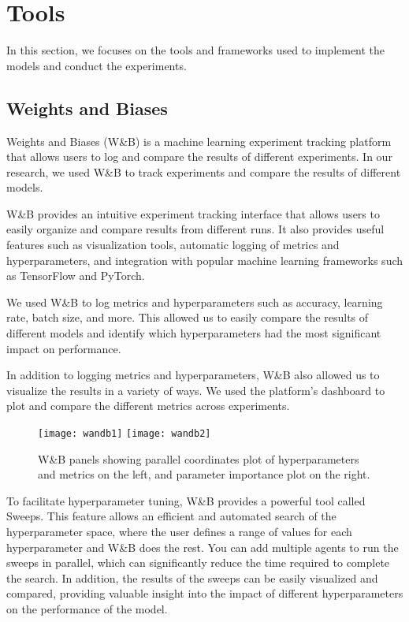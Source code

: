 \chapter{Tools}

In this section, we focuses on the tools and frameworks used to implement the models and conduct the experiments.

\section{Weights and Biases}

Weights and Biases (W\&B) \cite{wandb} is a machine learning experiment tracking platform that allows users to log and compare the results of different experiments. 
In our research, we used W\&B to track experiments and compare the results of different models.

W\&B provides an intuitive experiment tracking interface that allows users to easily organize and compare results from different runs.
It also provides useful features such as visualization tools, automatic logging of metrics and hyperparameters, and integration with popular machine learning frameworks such as TensorFlow and PyTorch.

We used W\&B to log metrics and hyperparameters such as accuracy, learning rate, batch size, and more. 
This allowed us to easily compare the results of different models and identify which hyperparameters had the most significant impact on performance.

In addition to logging metrics and hyperparameters, W\&B also allowed us to visualize the results in a variety of ways. 
We used the platform's dashboard to plot and compare the different metrics across experiments.

\begin{figure}[H]
  \centering
  \texttt{[image: wandb1]}
  \texttt{[image: wandb2]}
  \caption{W\&B panels showing parallel coordinates plot of hyperparameters and metrics on the left, and parameter importance plot on the right.}
\end{figure}


To facilitate hyperparameter tuning, W\&B provides a powerful tool called \\Sweeps.
This feature allows an efficient and automated search of the hyperparameter space, where the user defines a range of values for each hyperparameter and W\&B does the rest.
You can add multiple agents to run the sweeps in parallel, which can significantly reduce the time required to complete the search.
In addition, the results of the sweeps can be easily visualized and compared, providing valuable insight into the impact of different hyperparameters on the performance of the model.

